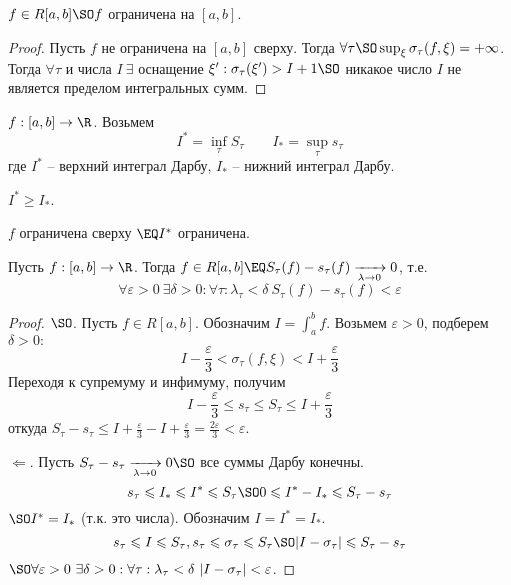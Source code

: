 \begin{Prop}
	$f \in R[a, b] \SO f$ ограничена на $[a, b]$.
\end{Prop}

\begin{proof}
	Пусть $f$ не ограничена на $[a, b]$ сверху. Тогда $\forall \tau \SO \sup_\xi \sigma_\tau (f, \xi) = +\infty$. Тогда 
	$\forall \tau$ и числа $I \ \exists$ оснащение $\xi' : \sigma_\tau (\xi') > I + 1 \SO$ никакое число $I$ не является пределом интегральных сумм.   
\end{proof}

\begin{Def}
	$f : [a, b] \to \R$. Возьмем
	\[I^* = \inf_\tau S_\tau \qquad I_* = \sup_\tau s_\tau\]
	где $I^*$ -- верхний интеграл Дарбу, $I_*$ -- нижний интеграл Дарбу.
\end{Def}

\begin{Rem}
	$I^* \geqslant I_*$.
\end{Rem}

\begin{Rem}
	$f$ ограничена сверху $\EQ I^*$ ограничена. 
\end{Rem}


\begin{Thm}
	Пусть $f : [a, b] \to \R$. Тогда $f \in R[a, b] \EQ S_\tau (f) - s_\tau (f) \xrightarrow[\lambda \to 0]{} 0$, т.е.
	\[\forall \varepsilon > 0 \ \exists \delta > 0 : \forall \tau : \lambda_\tau < \delta \ S_\tau(f) - s_\tau(f) < \varepsilon\] 
\end{Thm}

\begin{proof}
	$\SO$. Пусть $f \in R[a, b]$. Обозначим $I = \int_a^b f$. Возьмем $\varepsilon > 0$, подберем $\delta > 0 :$
	\[I - \frac{\varepsilon}{3} < \sigma_\tau (f, \xi) < I + \frac{\varepsilon}{3}\]
	Переходя к супремуму и инфимуму, получим
	\[I - \frac{\varepsilon}{3} \leqslant s_\tau \leqslant S_\tau \leqslant I + \frac{\varepsilon}{3}\]
	откуда $S_\tau - s_\tau \leqslant I + \frac{\varepsilon}{3} - I + \frac{\varepsilon}{3} = \frac{2\varepsilon}{3} < \varepsilon$.

	$\Leftarrow$. Пусть $S_\tau - s_\tau \xrightarrow[\lambda \to 0]{} 0 \SO$ все суммы Дарбу конечны.
	\[s_\tau \leqslant I_* \leqslant I^* \leqslant S_\tau \SO 0 \leqslant I^* - I_* \leqslant S_\tau - s_\tau\]
	$\SO I^* = I_*$ (т.к. это числа). Обозначим $I = I^* = I_*$.
	\[s_\tau \leqslant I \leqslant S_\tau, s_\tau \leqslant \sigma_\tau \leqslant S_\tau \SO |I - \sigma_\tau| \leqslant S_\tau - s_\tau\]
	$\SO \forall \varepsilon > 0 \ \exists \delta > 0 : \forall \tau : \lambda_\tau < \delta \ |I - \sigma_\tau| < \varepsilon$.   
\end{proof}

